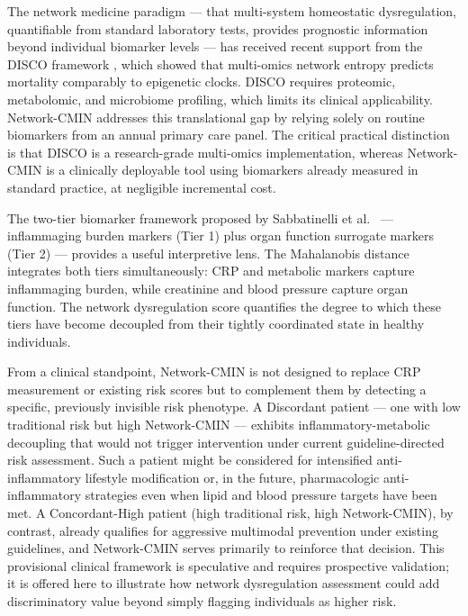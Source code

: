 \documentclass[11pt,a4paper]{article}
\begin{document}
The network medicine paradigm --- that multi-system homeostatic dysregulation, quantifiable from standard laboratory tests, provides prognostic information beyond individual biomarker levels --- has received recent support from the DISCO framework \cite{hao2025disco}, which showed that multi-omics network entropy predicts mortality comparably to epigenetic clocks. DISCO requires proteomic, metabolomic, and microbiome profiling, which limits its clinical applicability. Network-CMIN addresses this translational gap by relying solely on routine biomarkers from an annual primary care panel. The critical practical distinction is that DISCO is a research-grade multi-omics implementation, whereas Network-CMIN is a clinically deployable tool using biomarkers already measured in standard practice, at negligible incremental cost.

The two-tier biomarker framework proposed by Sabbatinelli et al.\ \cite{sabbatinelli2024inflammaging} --- inflammaging burden markers (Tier 1) plus organ function surrogate markers (Tier 2) --- provides a useful interpretive lens. The Mahalanobis distance integrates both tiers simultaneously: CRP and metabolic markers capture inflammaging burden, while creatinine and blood pressure capture organ function. The network dysregulation score quantifies the degree to which these tiers have become decoupled from their tightly coordinated state in healthy individuals.

From a clinical standpoint, Network-CMIN is not designed to replace CRP measurement or existing risk scores but to complement them by detecting a specific, previously invisible risk phenotype. A Discordant patient --- one with low traditional risk but high Network-CMIN --- exhibits inflammatory-metabolic decoupling that would not trigger intervention under current guideline-directed risk assessment. Such a patient might be considered for intensified anti-inflammatory lifestyle modification or, in the future, pharmacologic anti-inflammatory strategies even when lipid and blood pressure targets have been met. A Concordant-High patient (high traditional risk, high Network-CMIN), by contrast, already qualifies for aggressive multimodal prevention under existing guidelines, and Network-CMIN serves primarily to reinforce that decision. This provisional clinical framework is speculative and requires prospective validation; it is offered here to illustrate how network dysregulation assessment could add discriminatory value beyond simply flagging individuals as higher risk.
\end{document}
